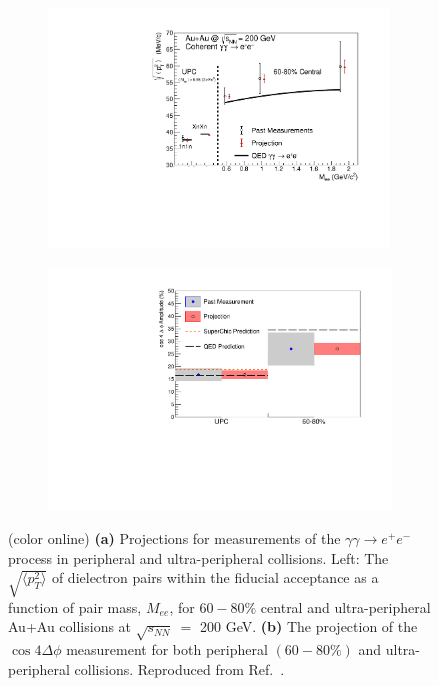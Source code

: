 \documentclass[twocolumn,epjc3]{svjour3}\sloppy
\begin{document}
\begin{figure}
    \centering
    \begin{subfigure}{.50\textwidth}
      \centering
      \includegraphics[width=0.99\textwidth]{fig/bur_fig57_left.pdf}
      \caption{}
    \end{subfigure}%
    \begin{subfigure}{.50\textwidth}
      \centering
      \includegraphics[width=.99\linewidth]{fig/bur_fig57_right.pdf}
      \caption{}
    \end{subfigure}
    \caption{(color online) \textbf{(a)} Projections for measurements of the $\gamma\gamma\rightarrow e^+e^-$ process in peripheral and ultra-peripheral collisions. Left: The $\sqrt{\langle p_T^2 \rangle }$ of dielectron pairs within the fiducial acceptance as a function of pair mass, $M_{ee}$, for $60-80\%$ central and ultra-peripheral Au+Au collisions at $\sqrt{s_{NN}}\ =$ 200 GeV. \textbf{(b)} The projection of the $\cos{4\Delta\phi}$ measurement for both peripheral $(60-80\%)$ and ultra-peripheral collisions. Reproduced from Ref.~\cite{SN0755STARBeam}. }
    \label{fig:future2}
\end{figure}
\end{document}
